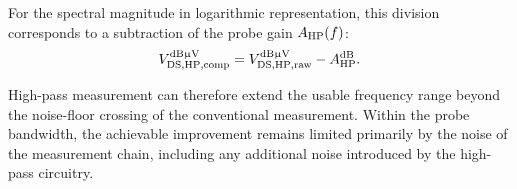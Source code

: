 For the spectral magnitude in logarithmic representation, this division corresponds to a subtraction of the probe gain ${A}_{\mathrm{HP}}(f)$:
\begin{equation}
	{V}_{\mathrm{DS,HP,comp}}^{\text{dB}\upmu\text{V}} = {V}_{\mathrm{DS,HP,raw}}^{\text{dB}\upmu\text{V}} - {A}_{\mathrm{HP}}^{\text{dB}}.
\end{equation}

High-pass measurement can therefore extend the usable frequency range beyond the noise-floor crossing of the conventional measurement.
Within the probe bandwidth, the achievable improvement remains limited primarily by the noise of the measurement chain, including any additional noise introduced by the high-pass circuitry.